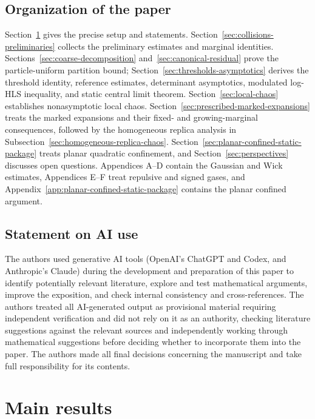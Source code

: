 \documentclass[11pt,reqno]{amsart}
\numberwithin{equation}{section}
\theoremstyle{plain}
\theoremstyle{definition}
\begin{document}
\subsection{Organization of the paper}
\label{subsec:organization}

Section~\ref{sec:main-results} gives the precise setup and statements. Section~\ref{sec:collisions-preliminaries} collects the preliminary estimates and marginal identities. Sections~\ref{sec:coarse-decomposition} and~\ref{sec:canonical-residual} prove the particle-uniform partition bound; Section~\ref{sec:thresholds-asymptotics} derives the threshold identity, reference estimates, determinant asymptotics, modulated log-HLS inequality, and static central limit theorem. Section~\ref{sec:local-chaos} establishes nonasymptotic local chaos. Section~\ref{sec:prescribed-marked-expansions} treats the marked expansions and their fixed- and growing-marginal consequences, followed by the homogeneous replica analysis in Subsection~\ref{sec:homogeneous-replica-chaos}. Section~\ref{sec:planar-confined-static-package} treats planar quadratic confinement, and Section~\ref{sec:perspectives} discusses open questions. Appendices A--D contain the Gaussian and Wick estimates, Appendices E--F treat repulsive and signed gases, and Appendix~\ref{app:planar-confined-static-package} contains the planar confined argument.

\subsection{Statement on AI use}

The authors used generative AI tools (OpenAI's ChatGPT and Codex, and Anthropic's Claude) during the development and preparation of this paper to identify potentially relevant literature, explore and test mathematical arguments, improve the exposition, and check internal consistency and cross-references.  The authors treated all AI-generated output as provisional material requiring independent verification and did not rely on it as an authority, checking literature suggestions against the relevant sources and independently working through mathematical suggestions before deciding whether to incorporate them into the paper.  The authors made all final decisions concerning the manuscript and take full responsibility for its contents.

\section{Main results}
\label{sec:main-results}
\end{document}
